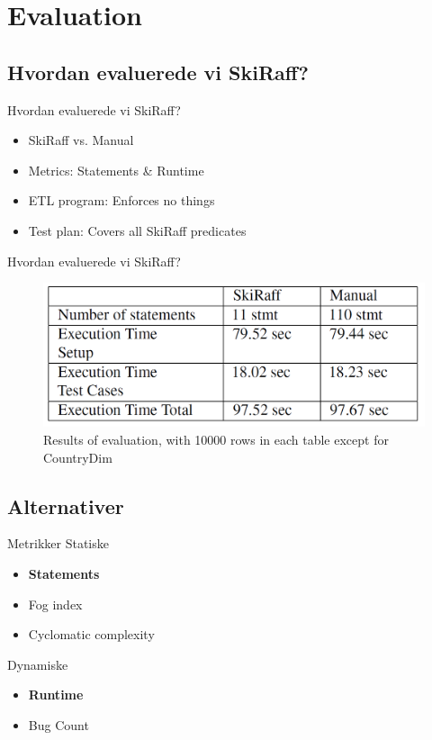 \section{Evaluation}
\subsection{Hvordan evaluerede vi SkiRaff?}

\begin{frame}{Hvordan evaluerede vi SkiRaff?}{}
  \begin{itemize}
    \item<1-> SkiRaff vs. Manual
    \item<2-> Metrics: Statements \& Runtime
    \item<3-> ETL program: Enforces no things
    \item<4-> Test plan: Covers all SkiRaff predicates

  \end{itemize}
\end{frame}

\begin{frame}{Hvordan evaluerede vi SkiRaff?}{}
   \begin{figure}
        \centering
        \includegraphics[width=1\textwidth]{figures/EvalResults.png}
        \caption{Results of evaluation, with 10000 rows in each table except for CountryDim}
        \label{Results of evaluation}
    \end{figure}
\end{frame}

\subsection{Alternativer}
\begin{frame}{Metrikker}{}
Statiske
  \begin{itemize}
    \item<1-> \textbf{Statements}
    \item<2-> Fog index
    \item<3-> Cyclomatic complexity
  	\end{itemize}

\pause
\pause
\pause
Dynamiske
  \begin{itemize}
    \item<4-> \textbf{Runtime}
    \item<5-> Bug Count
  	\end{itemize}
\end{frame}


